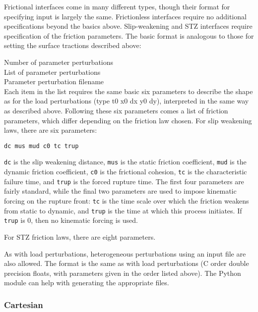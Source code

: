 \documentclass[12pt]{article}   	%
\begin{document}
Frictional interfaces come in many different types, though their format for specifying input is largely the same. Frictionless interfaces require no additional specifications beyond the basics above. Slip-weakening and STZ interfaces require specification of the friction parameters. The basic format is analogous to those for setting the surface tractions described above:

\vspace{0.1in}
\indent Number of parameter perturbations \\
\indent List of parameter perturbations \\
\indent Parameter perturbation filename \\

Each item in the list requires the same basic six parameters to describe the shape as for the load perturbations (type t0 x0 dx y0 dy), interpreted in the same way as described above. Following these six parameters comes a list of friction parameters, which differ depending on the friction law chosen. For slip weakening laws, there are six parameters:

\vspace{0.1in}
{\tt dc mus mud c0 tc trup}

\vspace{0.1in}
{\tt dc} is the slip weakening distance, {\tt mus} is the static friction coefficient, {\tt mud} is the dynamic friction coefficient, {\tt c0} is the frictional cohesion, {\tt tc} is the characteristic failure time, and {\tt trup} is the forced rupture time. The first four parameters are fairly standard, while the final two parameters are used to impose kinematic forcing on the rupture front: {\tt tc} is the time scale over which the friction weakens from static to dynamic, and {\tt trup} is the time at which this process initiates. If {\tt trup} is 0, then no kinematic forcing is used.

For STZ friction laws, there are eight parameters.

As with load perturbations, heterogeneous perturbations using an input file are also allowed. The format is the same as with load perturbations (C order double precision floats, with parameters given in the order listed above). The Python module can help with generating the appropriate files.

\subsubsection{Cartesian}
\end{document}
